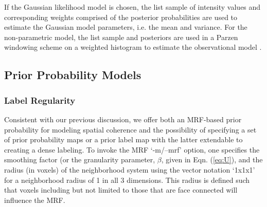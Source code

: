 \documentclass[11pt,english]{article}
\begin{document}
If the Gaussian likelihood model is chosen, the list sample of
intensity values and corresponding weights comprised of the posterior
probabilities are used to estimate the Gaussian model parameters, i.e.
the mean and variance.  For the non-parametric model, the list sample
and posteriors are used in a Parzen windowing scheme on a weighted
histogram to estimate the observational model \citep{Awate2006}.

\subsection{Prior Probability Models}
\subsubsection{Label Regularity}
Consistent with our previous discussion, we offer both an MRF-based
prior probability for modeling spatial coherence and the possibility
of specifying a set of prior probability maps or a prior label map
with the latter extendable to creating a dense labeling.  To invoke
the MRF `{\ttfamily -m/--mrf}' option, one specifies the smoothing
factor (or the granularity parameter, $\beta$, given in
Eqn. (\ref{eq:U}), and the radius (in voxels) of the neighborhood
system using the vector notation `{\ttfamily 1x1x1}' for a
neighborhood radius of 1 in all 3 dimensions.  This radius is defined
such that voxels including but not limited to those that are face
connected will influence the MRF.  

\doublespacing
\end{document}
